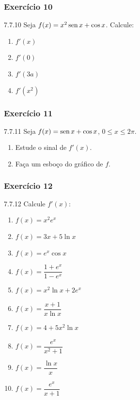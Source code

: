 \subsubsection*{Exercício 10}
\begin{exercicio}[10]{7.7.10}
Seja $f(x) = x^2 \operatorname{sen} x + \cos x$. Calcule:
\begin{enumerate}[label=\alph*)]
    \item $f'(x)$
    \item $f'(0)$
    \item $f'(3a)$
    \item $f'(x^2)$
\end{enumerate}
\end{exercicio}

\subsubsection*{Exercício 11}
\begin{exercicio}[11]{7.7.11}
Seja $f(x) = \operatorname{sen} x + \cos x$, $0 \le x \le 2\pi$.
\begin{enumerate}[label=\alph*)]
    \item Estude o sinal de $f'(x)$.
    \item Faça um esboço do gráfico de $f$.
\end{enumerate}
\end{exercicio}

\subsubsection*{Exercício 12}
\begin{exercicio}[12]{7.7.12}
Calcule $f'(x)$:
\begin{enumerate}[label=\alph*)]
    \item $f(x) = x^2 e^x$
    \item $f(x) = 3x + 5\ln x$
    \item $f(x) = e^x \cos x$
    \item $f(x) = \dfrac{1 + e^x}{1 - e^x}$
    \item $f(x) = x^2 \ln x + 2e^x$
    \item $f(x) = \dfrac{x + 1}{x\ln x}$
    \item $f(x) = 4 + 5x^2 \ln x$
    \item $f(x) = \dfrac{e^x}{x^2 + 1}$
    \item $f(x) = \dfrac{\ln x}{x}$
    \item $f(x) = \dfrac{e^x}{x + 1}$
\end{enumerate}
\end{exercicio}

